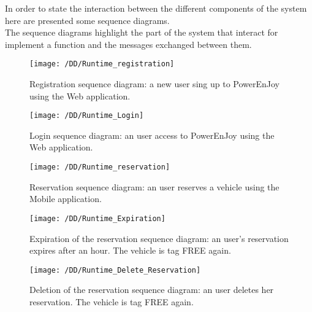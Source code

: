 In order to state the interaction between the different components of the system here are presented some sequence diagrams.
\\The sequence diagrams highlight the part of the system that interact for implement a function and the messages exchanged between them.


\begin{figure}[!ht]
  \centering
  \vspace{0.2cm}
  \texttt{[image: /DD/Runtime\_registration]}\\
  \vspace{0.4cm}
  \caption{Registration sequence diagram: a new user sing up to PowerEnJoy using the Web application. } 
  \label{fig:Runtime_registration} 
\end{figure}
\newpage
\begin{figure}[!ht]
  \centering
  \vspace{0.2cm}
  \texttt{[image: /DD/Runtime\_Login]}\\
  \vspace{0.4cm}
  \caption{Login sequence diagram: an user access to PowerEnJoy using the Web application. } 
  \label{fig:Runtime_Login} 
\end{figure}
\newpage
\begin{figure}[!ht]
  \centering
  \vspace{0.2cm}
  \texttt{[image: /DD/Runtime\_reservation]}\\
  \vspace{0.4cm}
  \caption{Reservation sequence diagram: an user reserves a vehicle using the Mobile application. } 
  \label{fig:Runtime_reservation} 
\end{figure}
\newpage
\begin{figure}[!ht]
  \centering
  \vspace{0.2cm}
  \texttt{[image: /DD/Runtime\_Expiration]}\\
  \vspace{0.4cm}
  \caption{Expiration of the reservation sequence diagram: an user's reservation expires after an hour. The vehicle is tag FREE again. } 
  \label{fig:Runtime_Expiration} 
\end{figure}
\newpage
\begin{figure}[!ht]
  \centering
  \vspace{0.2cm}
  \texttt{[image: /DD/Runtime\_Delete\_Reservation]}\\
  \vspace{0.4cm}
  \caption{Deletion of the reservation sequence diagram: an user deletes her reservation. The vehicle is tag FREE again. } 
  \label{fig:Runtime_Delete_Reservation} 
\end{figure}
\newpage